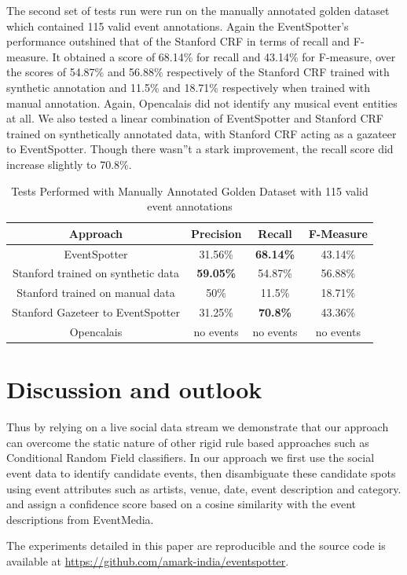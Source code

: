 \documentclass[10pt,a4paper]{article}
\begin{document}
The second set of tests run were run on the manually annotated golden dataset which contained 115 valid event annotations. Again the EventSpotter's performance outshined that of the Stanford CRF in terms of recall and F-measure. It obtained a score of 68.14\% for recall and 43.14\% for F-measure, over the scores of 54.87\% and 56.88\% respectively of the Stanford CRF trained with synthetic annotation and 11.5\% and 18.71\% respectively when trained with manual annotation. Again, Opencalais did not identify any musical event entities at all. We also tested a linear combination of EventSpotter and Stanford CRF trained on synthetically annotated data, with Stanford CRF acting as a gazateer to EventSpotter. Though there wasn''t a stark improvement, the recall score did increase slightly to 70.8\%.
\begin{table}
\centering %
\begin{tabular}{c c c c} %
\hline\hline %
Approach & Precision & Recall & F-Measure \\ [0.5ex] %
\hline %
EventSpotter & 31.56\% & \bf 68.14\% \bf & 43.14\% \\
Stanford trained on synthetic data & \bf 59.05\% \bf & 54.87\% & 56.88\%\\
Stanford trained on manual data & 50\% & 11.5\% & 18.71\% \\
Stanford Gazeteer to EventSpotter & 31.25\% & \bf 70.8\% \bf & 43.36\% \\
Opencalais & no events & no events & no events \\
\hline %
\end{tabular}
\caption{Tests Performed with Manually Annotated Golden Dataset with 115 valid event annotations} %
\label{table:nonlin} %
\end{table}

\section{Discussion and outlook}
Thus by relying on a live social data stream we demonstrate that our approach can overcome the static nature of other rigid rule based approaches such as Conditional Random Field classifiers. In our approach we first use the social event data to identify candidate events, then disambiguate these candidate spots using event attributes such as artists, venue, date, event description and category. and assign a confidence score based on a cosine similarity with the event descriptions from EventMedia. 

{\color{red}{G:Outlook.}}

The experiments detailed in this paper are reproducible and the source code is available at \url{https://github.com/amark-india/eventspotter}. 




\end{document}
